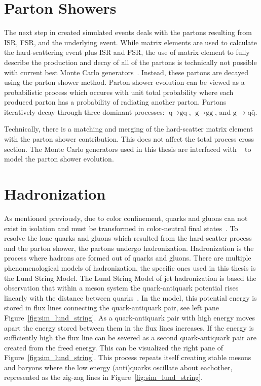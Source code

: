 \section{Parton Showers}
The next step in created simulated events deals with the partons resulting from ISR,
FSR, and the underlying event. 
While matrix elements are used to calculate the hard-scattering event plus ISR and FSR, 
the use of matrix element to fully describe the production and decay of all of the
partons is technically not possible with current best Monte Carlo generators~\cite{PhysRevD.94.074005}. 
Instead, these partons are decayed using the parton shower method. 
Parton shower evolution can be viewed as a probabilistic process 
which occures with unit total probability where each produced parton has a probability
of radiating another parton. Partons iteratively decay through three 
dominant processes: $\textrm{q} \to \textrm{gq}$, $\textrm{g} \to \textrm{gg}$, 
and $\textrm{g} \to \textrm{q}\bar{\textrm{q}}$. 

Technically, there is a matching and merging of the hard-scatter matrix element with the
parton shower contribution. This does not affect the total process cross section.
The Monte Carlo generators used in this thesis are interfaced with 
~\cite{Sjostrand:2014zea} to model the parton shower evolution.



\section{Hadronization}
As mentioned previously, due to color confinement, quarks and gluons can not exist in isolation
and must be transformed in color-neutral final states~\cite{Hoche:2014rga}. 
To resolve the lone quarks and gluons which resulted from the hard-scatter process and the parton 
shower, the partons undergo hadronization. Hadronization is the process where hadrons are formed 
out of quarks and gluons. There are multiple phenomenological models of hadronization, the
specific ones used in this thesis is the Lund String Model. The Lund String Model of jet
hadronization is based the observation that within a meson system the quark-antiquark 
potential rises linearly with the distance between quarks~\cite{Bali:1992ab}. In the model, this
potential energy is stored in flux lines connecting the quark-antiquark pair, see left pane 
Figure~\ref{fig:sim_lund_string}. As a quark-antiquark 
pair with high energy moves apart the energy stored between them in the flux lines increases. If the energy
is sufficiently high the flux line can be severed as a second quark-antiquark pair are created from
the freed energy. This can be visualized the right pane of Figure~\ref{fig:sim_lund_string}.
This process repeats itself creating stable mesons and baryons where the low energy (anti)quarks
oscillate about eachother, represented as the zig-zag lines in Figure~\ref{fig:sim_lund_string}.

